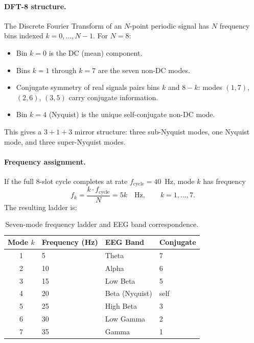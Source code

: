 \documentclass[11pt,a4paper]{article}
\begin{document}
\paragraph{DFT-8 structure.} The Discrete Fourier Transform of an
$N$-point periodic signal has $N$ frequency bins indexed $k=0,\ldots,N-1$.
For $N=8$:
\begin{itemize}
  \item Bin $k=0$ is the DC (mean) component.
  \item Bins $k=1$ through $k=7$ are the seven non-DC modes.
  \item Conjugate symmetry of real signals pairs bins $k$ and $8-k$:
    modes $(1,7)$, $(2,6)$, $(3,5)$ carry conjugate information.
  \item Bin $k=4$ (Nyquist) is the unique self-conjugate non-DC mode.
\end{itemize}

\noindent This gives a $3+1+3$ mirror structure: three sub-Nyquist
modes, one Nyquist mode, and three super-Nyquist modes.

\paragraph{Frequency assignment.} If the full 8-slot cycle completes at
rate $f_{\mathrm{cycle}}=40$~Hz, mode $k$ has frequency
\begin{equation}
  \label{eq:mode-freq}
  f_k = \frac{k \cdot f_{\mathrm{cycle}}}{N} = 5k \quad \text{Hz},
  \qquad k=1,\ldots,7.
\end{equation}
The resulting ladder is:

\begin{table}[H]
\centering
\caption{Seven-mode frequency ladder and EEG band correspondence.}
\label{tab:modes}
\begin{tabular}{@{}clll@{}}
\toprule
Mode $k$ & Frequency (Hz) & EEG Band & Conjugate \\
\midrule
1 & 5  & Theta       & 7 \\
2 & 10 & Alpha       & 6 \\
3 & 15 & Low Beta    & 5 \\
4 & 20 & Beta (Nyquist) & self \\
5 & 25 & High Beta   & 3 \\
6 & 30 & Low Gamma   & 2 \\
7 & 35 & Gamma       & 1 \\
\bottomrule
\end{tabular}
\end{table}
\end{document}
